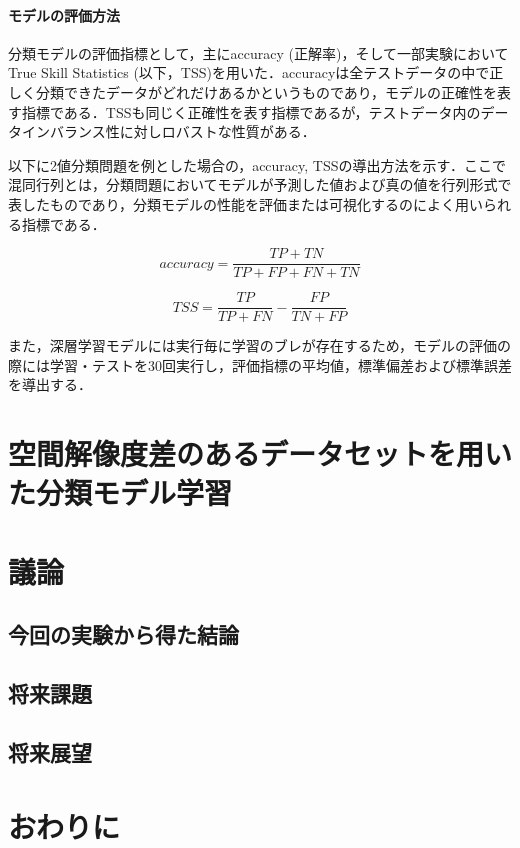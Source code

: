 \documentclass[a4j, 11pt]{jarticle}
\begin{document}
\paragraph{モデルの評価方法}
分類モデルの評価指標として，主にaccuracy (正解率)，そして一部実験においてTrue Skill Statistics (以下，TSS)を用いた．accuracyは全テストデータの中で正しく分類できたデータがどれだけあるかというものであり，モデルの正確性を表す指標である．TSSも同じく正確性を表す指標であるが，テストデータ内のデータインバランス性に対しロバストな性質がある．

以下に2値分類問題を例とした場合の，accuracy, TSSの導出方法を示す．ここで混同行列とは，分類問題においてモデルが予測した値および真の値を行列形式で表したものであり，分類モデルの性能を評価または可視化するのによく用いられる指標である．

\begin{equation}
 accuracy = \frac{TP + TN}{TP + FP + FN + TN}
 \label{equ:accuracy}
\end{equation}

\begin{equation}
	TSS = \frac{TP}{TP + FN} - \frac{FP}{TN + FP}
 \label{equ:tss}
\end{equation}

また，深層学習モデルには実行毎に学習のブレが存在するため，モデルの評価の際には学習・テストを30回実行し，評価指標の平均値，標準偏差および標準誤差を導出する．

\newpage
\section{空間解像度差のあるデータセットを用いた分類モデル学習}

\newpage
\section{議論}
\subsection{今回の実験から得た結論}
\subsection{将来課題}
\subsection{将来展望}

\newpage
\section{おわりに}
\end{document}
